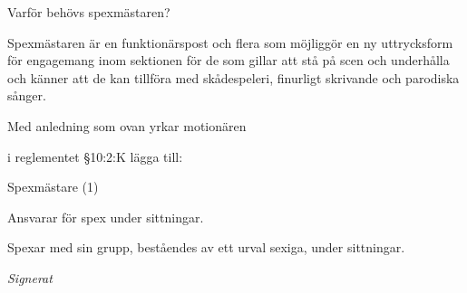\documentclass[../_main/handlingar.tex]{subfiles}
\begin{document}
Varför behövs spexmästaren?

Spexmästaren är en funktionärspost och flera som möjliggör en ny uttrycksform för engagemang inom sektionen för de som gillar att stå på scen och underhålla och känner att de kan tillföra med skådespeleri, finurligt skrivande och parodiska sånger.

Med anledning som ovan yrkar motionären
\begin{attsatser}
  \att i reglementet \S10:2:K lägga till:\par
  \begin{emptylist}
    \item Spexmästare (1)
      \begin{dashlist}
        \item Ansvarar för spex under sittningar.
        \item Spexar med sin grupp, beståendes av ett urval sexiga, under sittningar. 
      \end{dashlist}
    \end{emptylist}
    
    
    
    
\end{attsatser}




\begin{signatures}{1}
    \textit{Signerat}
    \signature{Adam Ekblom}{}

\end{signatures}
\end{document}
